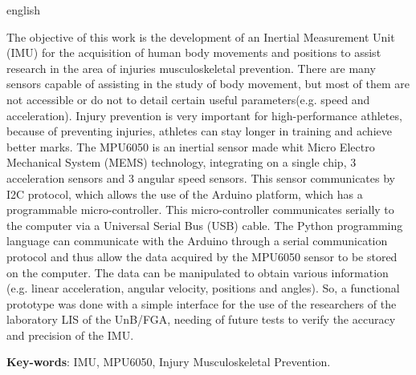 \begin{resumo}[Abstract]
 \begin{otherlanguage*}{english}
 	
 	The objective of this work is the development of an Inertial Measurement Unit (IMU) for the acquisition of human body movements and positions to assist research in the area of injuries musculoskeletal prevention. There are many sensors capable of assisting in the study of body movement, but most of them are not accessible or do not to detail certain useful parameters(e.g. speed and acceleration). Injury prevention is very important for high-performance athletes, because of preventing injuries, athletes can stay longer in training and achieve better marks. The MPU6050 is an inertial sensor made whit Micro Electro Mechanical System (MEMS) technology, integrating on a single chip, 3 acceleration sensors and 3 angular speed sensors. This sensor communicates by I2C protocol, which allows the use of the Arduino platform, which has a programmable micro-controller. This micro-controller communicates serially to the computer via a Universal  Serial Bus (USB) cable. The Python programming language can communicate with the Arduino through a serial communication protocol and thus allow the data acquired by the MPU6050 sensor to be stored on the computer. The data can be manipulated to obtain various information (e.g. linear acceleration, angular velocity, positions and angles). So, a functional prototype was done with a simple interface for the use of the researchers of the laboratory LIS of the UnB/FGA, needing of future tests to verify the accuracy and precision of the IMU.

   \vspace{\onelineskip}
 
   \noindent 
   \textbf{Key-words}: IMU, MPU6050, Injury Musculoskeletal Prevention.
 \end{otherlanguage*}
\end{resumo}
